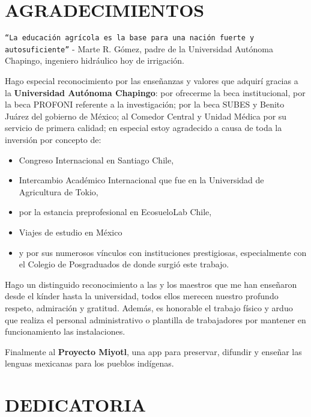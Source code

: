 

\chapter*{AGRADECIMIENTOS}
\begin{center}
    \texttt{``La educación agrícola es la base para una nación fuerte y autosuficiente''} - Marte R. Gómez, padre de la Universidad Autónoma Chapingo, ingeniero hidráulico hoy de irrigación.
\end{center}

Hago especial reconocimiento por las enseñanzas y valores que adquirí gracias a la \textbf{Universidad Autónoma Chapingo}: por ofrecerme la beca institucional, por la beca PROFONI referente a la investigación; por la beca SUBES y Benito Juárez del gobierno de México; al Comedor Central y Unidad Médica por su servicio de primera calidad; en especial estoy agradecido a causa de toda la inversión por concepto de:
\begin{itemize}
    \item Congreso Internacional en Santiago Chile, 
    \item Intercambio Académico Internacional que fue en la Universidad de Agricultura de Tokio, 
    \item por la estancia preprofesional en EcosueloLab Chile, 
    \item Viajes de estudio en México
    \item y por sus numerosos vínculos con instituciones prestigiosas, especialmente con el Colegio de Posgraduados de donde surgió este trabajo.
\end{itemize}

Hago un distinguido reconocimiento a las y los maestros que me han enseñaron desde el kínder hasta la universidad, todos ellos merecen nuestro profundo respeto, admiración y gratitud. Además, es honorable el trabajo físico y arduo que realiza el personal administrativo o plantilla de trabajadores por mantener en funcionamiento las instalaciones.

Finalmente al \textbf{Proyecto Miyotl}, una app para preservar, difundir y enseñar las lenguas mexicanas para los pueblos indígenas.
\newpage

\chapter*{DEDICATORIA}

